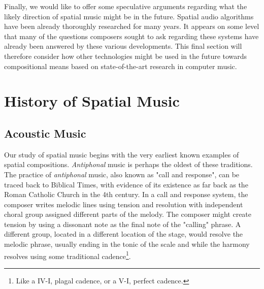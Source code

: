 Finally, we would like to offer some speculative arguments regarding what the likely direction of spatial music might be in the future. Spatial audio algorithms have been already thoroughly researched for many years. It appears on some level that many of the questions composers sought to ask regarding these systems have already been answered by these various developments. This final section will therefore consider how other technologies might be used in the future towards compositional means based on state-of-the-art research in computer music. 


\section{History of Spatial Music} \label{sec:hist_spat_mus}


\subsection{Acoustic Music} \label{subsec:acoustic_mus}

Our study of spatial music begins with the very earliest known examples of spatial compositions. \textit{Antiphonal} music is perhaps the oldest of these traditions. The practice of \textit{antiphonal} music, also known as "call and response", can be traced back to Biblical Times, with evidence of its existence as far back as the Roman Catholic Church in the 4th century. In a call and response system, the composer writes melodic lines using tension and resolution with independent choral group assigned different parts of the melody. The composer might create tension by using a dissonant note as the final note of the "calling" phrase. A different group, located in a different location of the stage, would resolve the melodic phrase, usually ending in the tonic of the scale and while the harmony resolves using some traditional cadence\footnote{Like a IV-I, plagal cadence, or a V-I, perfect cadence.}. 


